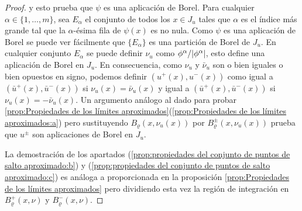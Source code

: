 \documentclass[a4paper,11pt,spanish, twoside, leqno]{tfm-uam}
\begin{document}
\begin{proof}
y esto prueba que $\psi$ es una aplicación de Borel. Para cualquier $\alpha\in \{1, \ldots, m\}$, sea $E_{\alpha}$ el conjunto de todos los $x\in J_{u}$ tales que $\alpha$ es el índice más grande tal que la $\alpha$-ésima fila de $\psi(x)$ es no nula. Como $\psi$ es una aplicación de Borel se puede ver fácilmente que $\{E_{\alpha}\}$ es una partición de Borel de $J_{u}$. En cualquier conjunto $E_{\alpha}$ se puede definir $\nu_{u}$ como $\phi^{\alpha}/\lvert\phi^{\alpha}\rvert$, esto define una aplicación de Borel en $J_{u}$. En consecuencia, como $\nu_{u}$ y $\bar{\nu}_{u}$ son o bien iguales o bien opuestos en signo, podemos definir $(u^{+}(x), u^{-}(x))$ como igual a $(\bar{u}^{+}(x), \bar{u}^{-}(x))$ si $\nu_{u}(x)=\bar{\nu}_{u}(x)$ y igual a $(\bar{u}^{+}(x), \bar{u}^{-}(x))$ si $\nu_{u}(x)=-\bar{\nu}_{u}(x)$. Un argumento análogo al dado para probar \ref{prop:Propiedades de los límites aproximados}(\ref{prop:Propiedades de los límites aproximados:a}) pero sustituyendo $B_{\varrho}(x,\nu_{u}(x))$ por $B^{\pm}_{\varrho}(x,\nu_{u}(x))$ prueba que $u^{\pm}$ son aplicaciones de Borel en $J_{u}$.

La demostración de los apartados (\ref{prop:propiedades del conjunto de puntos de salto aproximado:b}) y (\ref{prop:propiedades del conjunto de puntos de salto aproximado:c}) es análoga a proporcionada en la proposición \ref{prop:Propiedades de los límites aproximados} pero dividiendo esta vez la región de integración en $B^{+}_{\varrho}(x, \nu)$ y $B^{-}_{\varrho}(x, \nu)$. 
\end{proof}
\end{document}
